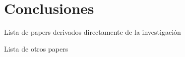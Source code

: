 \chapter{Conclusiones}

    Lista de papers derivados directamente de la investigación

    Lista de otros papers